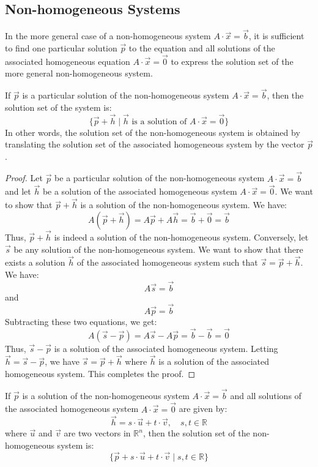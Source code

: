 \subsection{Non-homogeneous Systems}
In the more general case of a non-homogeneous system $A \cdot \vec{x} = \vec{b}$, it is sufficient to find one particular solution $\vec{p}$ to the equation and all solutions of the associated homogeneous equation $A \cdot \vec{x} = \vec{0}$ to express the solution set of the more general non-homogeneous system.
\begin{theorem}
    If $\vec{p}$ is a particular solution of the non-homogeneous system $A \cdot \vec{x} = \vec{b}$, then the solution set of the system is:
    \[
        \{ \vec{p} + \vec{h} \mid \vec{h} \text{ is a solution of } A \cdot \vec{x} = \vec{0} \}
    \]
    In other words, the solution set of the non-homogeneous system is obtained by translating the solution set of the associated homogeneous system by the vector $\vec{p}$.
\end{theorem}
\begin{proof}
    Let $\vec{p}$ be a particular solution of the non-homogeneous system $A \cdot \vec{x} = \vec{b}$ and let $\vec{h}$ be a solution of the associated homogeneous system $A \cdot \vec{x} = \vec{0}$. We want to show that $\vec{p} + \vec{h}$ is a solution of the non-homogeneous system. We have:
    \[
        A(\vec{p} + \vec{h}) = A\vec{p} + A\vec{h} = \vec{b} + \vec{0} = \vec{b}
    \]
    Thus, $\vec{p} + \vec{h}$ is indeed a solution of the non-homogeneous system. Conversely, let $\vec{s}$ be any solution of the non-homogeneous system. We want to show that there exists a solution $\vec{h}$ of the associated homogeneous system such that $\vec{s} = \vec{p} + \vec{h}$. We have:
    \[
        A\vec{s} = \vec{b}
    \]
    and
    \[
        A\vec{p} = \vec{b}
    \]
    Subtracting these two equations, we get:
    \[
        A(\vec{s} - \vec{p}) = A\vec{s} - A\vec{p} = \vec{b} - \vec{b} = \vec{0}
    \]
    Thus, $\vec{s} - \vec{p}$ is a solution of the associated homogeneous system. Letting $\vec{h} = \vec{s} - \vec{p}$, we have $\vec{s} = \vec{p} + \vec{h}$ where $\vec{h}$ is a solution of the associated homogeneous system. This completes the proof.
\end{proof}

\begin{eg}
    If $\vec{p}$ is a solution of the non-homogeneous system $A \cdot \vec{x} = \vec{b}$ and all solutions of the associated homogeneous system $A \cdot \vec{x} = \vec{0}$ are given by:
    \[
        \vec{h} = s \cdot \vec{u} + t \cdot \vec{v}, \quad s, t \in \mathbb{R}
    \]
    where $\vec{u}$ and $\vec{v}$ are two vectors in $\mathbb{R}^n$, then the solution set of the non-homogeneous system is:
    \[
        \{ \vec{p} + s \cdot \vec{u} + t \cdot \vec{v} \mid s, t \in \mathbb{R} \}
    \]
\end{eg}

